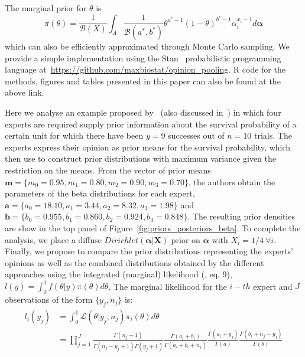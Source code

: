 \documentclass[a4paper, notitlepage, 11pt]{article}
\begin{document}
The marginal prior for $\theta$ is
\begin{equation}
\label{eq:marginalbeta}
\pi(\theta) = \frac{1}{\mathcal{B}(X)}\int_{A} \frac{1}{\mathcal{B}(a^*, b^*)} \theta^{a^* -1}(1-\theta)^{b^* -1}\alpha_i^{x_i-1}d\boldsymbol\alpha 
\end{equation}
which can also be efficiently approximated through Monte Carlo sampling.
We provide a simple implementation using the Stan~\citep{stan2014} probabilistic programming language at~\url{https://github.com/maxbiostat/opinion_pooling}.
R code for the methods, figures and tables presented in this paper can also be found at the above link.

Here we analyse an example proposed by~\cite{savchuk1994} (also discussed in~\cite{rufo2012B}) in which four experts are required supply prior information about the survival probability of a certain unit for which there have been $y = 9$ successes out of $n = 10$ trials.
The experts express their opinion as prior means for the survival probability, which~\cite{savchuk1994} then use to construct prior distributions with maximum variance given the restriction on the means.
From the vector of prior means $\mathbf{m} = \{ m_0 = 0.95, m_1 = 0.80, m_2 = 0.90, m_3 = 0.70 \}$, the authors obtain the parameters of the beta distributions for each expert,  $\mathbf{a} = \{ a_0 = 18.10, a_1 = 3.44 , a_2 = 8.32, a_3 = 1.98 \}$ and  $\mathbf{b} = \{ b_0 = 0.955 , b_1 = 0.860, b_2 = 0.924, b_3 = 0.848\}$.
The resulting prior densities are show in the top panel of Figure~\ref{fig:priors_posteriors_beta}.
To complete the analysis, we place a diffuse $Dirichlet(\boldsymbol\alpha | \boldsymbol X)$ prior on $\boldsymbol\alpha$ with $X_i = 1/4 \: \forall i$.
Finally, we propose to compare the prior distributions representing the experts' opinions as well as the combined distributions obtained by the different approaches using the integrated (marginal) likelihood (\cite{raftery2007}, eq. 9), $l(y) = \int_{0}^{1}f(\theta|y)\pi(\theta)d\theta$.
The marginal likelihood for the $i-th$ expert and $J$ observations of the form $\{ y_j, n_j\}$ is:
\begin{align}
  \label{eq:marglike}
l_i(y_j) &= \int_{0}^{1}\mathcal{L}(\theta|y_j, n_j)\pi_i(\theta)d\theta\nonumber\\
 &= \prod_{j = 1}^{J}\frac{\Gamma(n_j-1)}{\Gamma(n_j-y_j + 1)\Gamma(y_j+1)}\frac{\Gamma(a_i + b_i)}{\Gamma(a_i + b_i + n_j)}\frac{\Gamma(a_i + y_j)}{\Gamma(a)}\frac{\Gamma(b_i + n_j - y_j) }{\Gamma(b)}
 \end{align}
 
\end{document}
